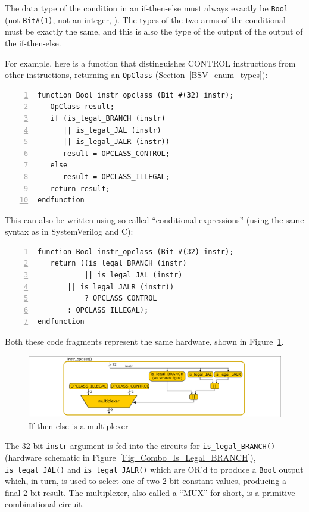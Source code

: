 The data type of the condition in an if-then-else must always exactly
be \verb|Bool| (not \verb|Bit#(1)|, not an integer, {\etc}).  The
types of the two arms of the conditional must be exactly the same, and
this is also the type of the output of the output of the if-then-else.

For example, here is a function that distinguishes CONTROL
instructions from other instructions, returning an \verb|OpClass|
(Section~\ref{BSV_enum_types}):

\begin{Verbatim}[frame=single, numbers=left]
function Bool instr_opclass (Bit #(32) instr);
   OpClass result;
   if (is_legal_BRANCH (instr)
      || is_legal_JAL (instr)
      || is_legal_JALR (instr))
      result = OPCLASS_CONTROL;
   else
      result = OPCLASS_ILLEGAL;
   return result;
endfunction
\end{Verbatim}

This can also be written using so-called ``conditional expressions''
(using the same syntax as in SystemVerilog and C):

\begin{Verbatim}[frame=single, numbers=left]
function Bool instr_opclass (Bit #(32) instr);
   return ((is_legal_BRANCH (instr)
           || is_legal_JAL (instr)
	   || is_legal_JALR (instr))
           ? OPCLASS_CONTROL
	   : OPCLASS_ILLEGAL);
endfunction
\end{Verbatim}

Both these code fragments represent the same hardware, shown in
Figure~\ref{Fig_Combo_Multiplexer}.
\begin{figure}[htbp]
  \centerline{\includegraphics[width=6in,angle=0]{ch040_Combo_Circuits/Figures/Fig_Combo_Multiplexer}}
  \caption{\label{Fig_Combo_Multiplexer}If-then-else is a multiplexer}
\end{figure}
The 32-bit \verb|instr| argument is fed into the circuits for
\verb|is_legal_BRANCH()| (hardware schematic in
Figure~\ref{Fig_Combo_Is_Legal_BRANCH}), \verb|is_legal_JAL()| and
\verb|is_legal_JALR()| which are OR'd to produce a \verb|Bool| output
which, in turn, is used to select one of two 2-bit constant values,
producing a final 2-bit result.  The multiplexer, also called a
``MUX'' for short, is a primitive combinational circuit.

